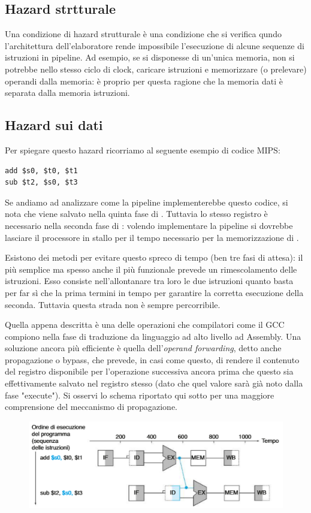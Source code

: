 \documentclass[class=book, crop=false, oneside]{standalone}
\begin{document}
\subsection{Hazard strtturale}
Una condizione di hazard strutturale è una condizione che si verifica qundo l'architettura dell’elaboratore rende impossibile l’esecuzione di alcune sequenze di istruzioni in pipeline. Ad esempio, se si disponesse di un'unica memoria, non si potrebbe nello stesso ciclo di clock, caricare istruzioni e memorizzare (o prelevare) operandi dalla memoria: è proprio per questa ragione che la memoria dati è separata dalla memoria istruzioni.

\subsection{Hazard sui dati}
Per spiegare questo hazard ricorriamo al seguente esempio di codice MIPS:
\begin{verbatim}
add $s0, $t0, $t1
sub $t2, $s0, $t3
\end{verbatim}
Se andiamo ad analizzare come la pipeline implementerebbe questo codice, si nota che  viene salvato nella quinta fase di . Tuttavia lo stesso registro è necessario nella seconda fase di : volendo implementare la pipeline si dovrebbe lasciare il processore in stallo per il tempo necessario per la memorizzazione di .

Esistono dei metodi per evitare questo spreco di tempo (ben tre fasi di attesa): il più semplice ma spesso anche il più funzionale prevede un rimescolamento delle istruzioni. Esso consiste nell'allontanare tra loro le due istruzioni quanto basta per far sì che la prima termini in tempo per garantire la corretta esecuzione della seconda. Tuttavia questa strada non è sempre percorribile.

Quella appena descritta è una delle operazioni che compilatori come il GCC compiono nella fase di traduzione da linguaggio ad alto livello ad Assembly. Una soluzione ancora più efficiente è quella dell'\emph{operand forwarding}, detto anche propagazione o bypass, che prevede, in casi come questo, di rendere il contenuto del registro  disponibile per l'operazione successiva ancora prima che questo sia effettivamente salvato nel registro stesso (dato che quel valore sarà già noto dalla fase "execute").
Si osservi lo schema riportato qui sotto per una maggiore comprensione del meccanismo di propagazione.
\begin{figure}
	\centering
	\includegraphics[width=.8\textwidth,keepaspectratio]{propagazione.png}
\end{figure}
\end{document}
